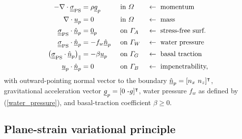 {\small
\begin{align}
  \label{ps_cons_momentum}
  -\nabla \cdot \underline{\underline{\sigma}}_{\text{PS}} &= \rho\underline{g}_p &&\text{ in } \varOmega &&\leftarrow \text{ momentum} \\
  \label{ps_cons_mass}
  \nabla \cdot \underline{u}_p &= 0 &&\text{ in } \varOmega &&\leftarrow \text{ mass}  \\
  \label{ps_surface_stress}
  \underline{\underline{\sigma}}_{\text{PS}} \cdot \underline{\hat{n}}_p &= \underline{0}_p &&\text{ on } \varGamma_A &&\leftarrow \text{ stress-free surf.} \\
  \label{ps_water_stress}
  \underline{\underline{\sigma}}_{\text{PS}} \cdot \underline{\hat{n}}_p &= -f_w \underline{\hat{n}}_p &&\text{ on } \varGamma_W &&\leftarrow \text{ water pressure} \\
  \label{ps_basal_drag}
  \big( \underline{\underline{\sigma}}_{\text{PS}} \cdot \underline{\hat{n}}_p \big)_{\Vert} &= -\beta \underline{u}_p &&\text{ on } \varGamma_G &&\leftarrow \text{ basal traction } \\
  \label{ps_impenetrability}
  \underline{u}_p \cdot \underline{\hat{n}}_p &= 0 &&\text{ on } \varGamma_B &&\leftarrow \text{ impenetrability,}
\end{align}}
with outward-pointing normal vector to the boundary $\normal_p = [n_x\ n_z]^\intercal$, gravitational acceleration vector $\underline{g}_p = [0\ \text{-}g]^\intercal$, water pressure $f_w$ as defined by (\ref{water_pressure}), and basal-traction coefficient $\beta \geq 0$.

\subsection{Plane-strain variational principle} \label{ssn_plane_strain_var_prin}

